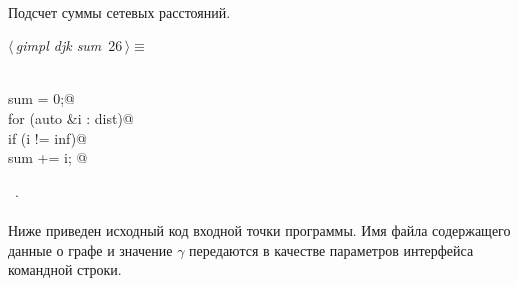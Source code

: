 \documentclass[12pt]{article}
\begin{document}
\paragraph{}
Подсчет суммы сетевых расстояний.
\begin{flushleft} \small
\begin{minipage}{\linewidth}\label{scrap41}\raggedright\small
{} $\langle\,${\itshape gimpl djk sum}\nobreak\ {\footnotesize {26}}$\,\rangle\equiv$
\vspace{-1ex}
\begin{list}{}{} \item
\mbox{}\verb@@\\
\mbox{}\verb@double sum = 0;@\\
\mbox{}\verb@    for (auto &i : dist)@\\
\mbox{}\verb@        if (i != inf)@\\
\mbox{}\verb@            sum += i; @\\
\mbox{}\verb@@{\NWsep}
\end{list}
\vspace{-1.5ex}
\footnotesize
\begin{list}{}{\setlength{\itemsep}{-\parsep}\setlength{\itemindent}{-\leftmargin}}
\item \NWtxtMacroRefIn\ .

\item{}
\end{list}
\end{minipage}\vspace{4ex}
\end{flushleft}
\paragraph{}
Ниже приведен исходный код входной точки программы. 
Имя файла содержащего данные о графе и значение 
$\gamma$ передаются в качестве параметров интерфейса командной строки.
\end{document}
